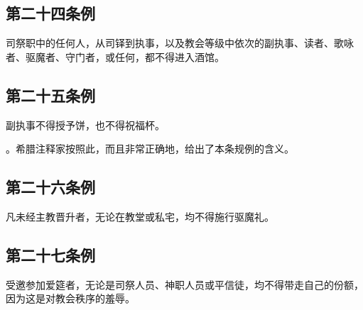 
\subsection{第二十四条例}

司祭职中的任何人，从司铎到执事，以及教会等级中依次的副执事、读者、歌咏者、驱魔者、守门者，或任何，都不得进入酒馆。\par


\subsection{第二十五条例}

副执事不得授予饼，也不得祝福杯。\par

。希腊注释家按照此，而且非常正确地，给出了本条规例的含义。\par


\subsection{第二十六条例}

凡未经主教晋升者，无论在教堂或私宅，均不得施行驱魔礼。\par


\subsection{第二十七条例}

受邀参加爱筵者，无论是司祭人员、神职人员或平信徒，均不得带走自己的份额，因为这是对教会秩序的羞辱。\par

\par

